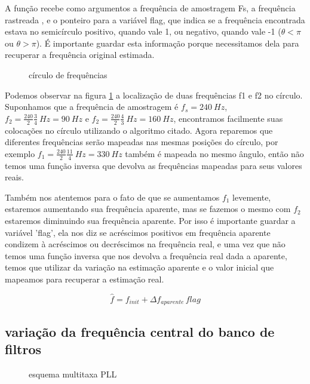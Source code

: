 \documentclass[a4paper, 12pt]{book}
\begin{document}


A função recebe como argumentos a frequência de amostragem Fs, a frequência rastreada , e o ponteiro para a variável flag, que indica se a frequência encontrada estava no semicírculo positivo, quando vale 1, ou negativo, quando vale -1 ($\theta<\pi$ ou $\theta>\pi$). É importante guardar esta informação porque necessitamos dela para recuperar a frequência original estimada. 

\begin{figure}[h]
	\centering    
	\def\svgwidth{\columnwidth}
	
	\caption{círculo de frequências}
	\label{fig:freq_circ}
\end{figure}

\indent Podemos observar na figura \ref{fig:freq_circ} a localização de duas frequências f1 e f2 no círculo. Suponhamos que a frequência de amostragem é $f_s=240 \:Hz$, $f_2=\frac{240}{2} \frac{3}{4} \: Hz = 90 \: Hz$ e $f_2=\frac{240}{2} \frac{4}{3} \: Hz = 160 \: Hz$, encontramos facilmente suas colocações no círculo utilizando o algoritmo citado. Agora reparemos que diferentes frequências serão mapeadas nas mesmas posições do círculo, por exemplo $f_1=\frac{240}{2} \frac{11}{4} \: Hz = 330 \: Hz$ também é mapeada no mesmo ângulo, então não temos uma função inversa que devolva as frequências mapeadas para seus valores reais. 

\indent Também nos atentemos para o fato de que se aumentamos $f_1$ levemente, estaremos aumentando sua frequência aparente, mas se fazemos o mesmo com $f_2$ estaremos diminuindo sua frequência aparente. Por isso é importante guardar a variável 'flag', ela nos diz se acréscimos positivos em frequência aparente condizem à acréscimos ou decréscimos na frequência real, e uma vez que não temos uma função inversa que nos devolva a frequência real dada a aparente, temos que utilizar da variação na estimação aparente e o valor inicial que mapeamos para recuperar a estimação real.

\begin{equation}
\hat{f}=f_{init}+\Delta f_{aparente}\, flag
\end{equation}

\subsection{variação da frequência central do banco de filtros}

\begin{figure}[h]
	\centering    
	\def\svgscale{0.7}
	
	\caption{esquema multitaxa PLL}
	\label{fig:esquema_pll}
\end{figure}
\end{document}
